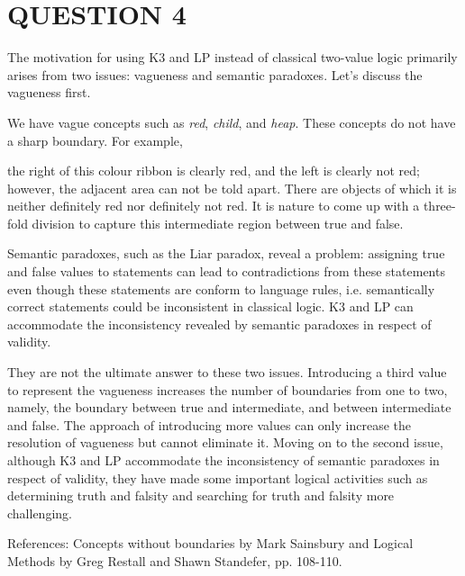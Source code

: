 \section*{QUESTION 4}

The motivation for using K3 and LP instead of classical two-value logic primarily arises from two issues: vagueness and semantic paradoxes. Let's discuss the vagueness first.

We have vague concepts such as \textit{red}, \textit{child}, and \textit{heap}. These concepts do not have a sharp boundary. For example,
\begin{center}
\end{center}
the right of this colour ribbon is clearly red, and the left is clearly not red; however, the adjacent area can not be told apart. There are objects of which it is neither definitely red nor definitely not red. It is nature to come up with a three-fold division to capture this intermediate region between true and false.

Semantic paradoxes, such as the Liar paradox, reveal a problem: assigning true and false values to statements can lead to contradictions from these statements even though these statements are conform to language rules, i.e. semantically correct statements could be inconsistent in classical logic. K3 and LP can accommodate the inconsistency revealed by semantic paradoxes in respect of validity.

They are not the ultimate answer to these two issues. Introducing a third value to represent the vagueness increases the number of boundaries from one to two, namely, the boundary between true and intermediate, and between intermediate and false. The approach of introducing more values can only increase the resolution of vagueness but cannot eliminate it. Moving on to the second issue, although K3 and LP accommodate the inconsistency of semantic paradoxes in respect of validity, they have made some important logical activities such as determining truth and falsity and searching for truth and falsity more challenging.

References: Concepts without boundaries by Mark Sainsbury and Logical Methods by Greg Restall and Shawn Standefer, pp. 108-110.
